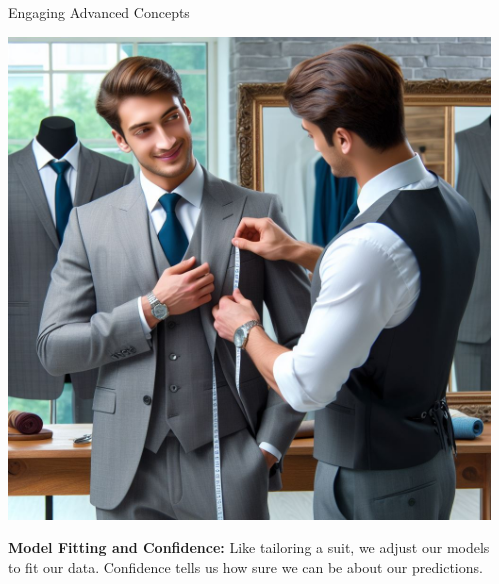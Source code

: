 \documentclass[final]{beamer}
\begin{document}
\begin{frame}[t]{}
\begin{columns}[t]
\begin{column}{.3\textwidth}
\begin{block}{Engaging Advanced Concepts}
				\begin{minipage}{0.3\textwidth}
					\centering
					\includegraphics[width=\linewidth]{./images/1-2-3-TailorSuit.jpeg}
				\end{minipage}
				\hfill
				\begin{minipage}{0.68\textwidth}
					\textbf{Model Fitting and Confidence:} Like tailoring a suit, we adjust our models to fit our data. Confidence tells us how sure we can be about our predictions.
				\end{minipage}

				\vspace{1.75cm}

			\end{block}

		\end{column}

		\begin{column}{.33\textwidth}

			\vspace{-0.6cm}

			\begin{block}{}
				\centering
				\Large \textbf{\inserttitle}\\

				\vspace{1cm}


\end{block}
\end{column}
\end{columns}
\end{frame}
\end{document}
